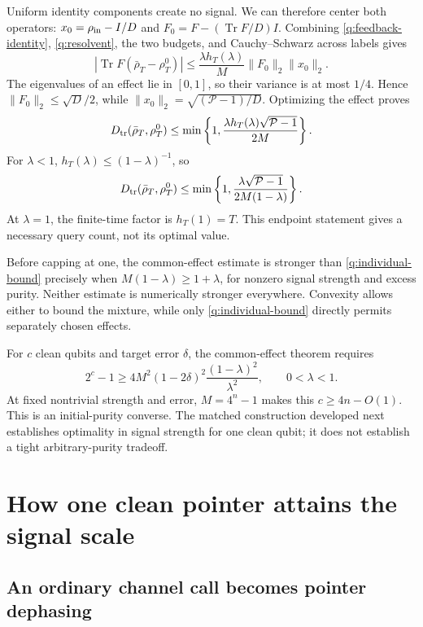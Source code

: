 \documentclass[11pt,a4paper]{article}
\numberwithin{equation}{section}
\theoremstyle{definition}
\theoremstyle{remark}
\DeclareMathOperator{\Tr}{Tr}
\begin{document}
Uniform identity components create no signal. We can therefore center both
operators:
$x_0=\rho_{\rm in}-I/D$ and
$F_0=F-(\Tr F/D)I$. Combining
\eqref{q:feedback-identity}, \eqref{q:resolvent}, the two budgets, and
Cauchy--Schwarz across labels gives
\[
 \left|\Tr F(\bar\rho_T-\rho_T^0)\right|
 \leq\frac{\lambda h_T(\lambda)}{M}\|F_0\|_2\|x_0\|_2 .
\]
The eigenvalues of an effect lie in $[0,1]$, so their variance is at most
$1/4$. Hence
$\|F_0\|_2\leq\sqrt{D}/2$, while
$\|x_0\|_2=\sqrt{(\mathcal P-1)/D}$. Optimizing the effect proves
\begin{equation}
 D_{\rm tr}(\bar\rho_T,\rho_T^0)
 \leq\min\left\{1,
       \frac{\lambda h_T(\lambda)\sqrt{\mathcal P-1}}{2M}\right\}.
 \label{q:common-finite}
\end{equation}
For $\lambda<1$, $h_T(\lambda)\leq(1-\lambda)^{-1}$, so
\begin{equation}
 D_{\rm tr}(\bar\rho_T,\rho_T^0)
 \leq\min\left\{1,
       \frac{\lambda\sqrt{\mathcal P-1}}{2M(1-\lambda)}\right\}.
 \label{q:common-infinite}
\end{equation}
At $\lambda=1$, the finite-time factor is $h_T(1)=T$.
This endpoint statement gives a necessary query count, not its optimal value.

Before capping at one, the common-effect estimate is stronger than
\eqref{q:individual-bound} precisely when
$M(1-\lambda)\geq1+\lambda$, for nonzero signal strength and excess purity.
Neither estimate is numerically stronger everywhere. Convexity allows either
to bound the mixture, while only \eqref{q:individual-bound} directly permits
separately chosen effects.

For $c$ clean qubits and target error $\delta$, the common-effect theorem
requires
\begin{equation}
 2^c-1\geq
 4M^2(1-2\delta)^2\frac{(1-\lambda)^2}{\lambda^2},
 \qquad 0<\lambda<1.
 \label{q:several-clean}
\end{equation}
At fixed nontrivial strength and error, $M=4^n-1$ makes this
$c\geq4n-O(1)$. This is an initial-purity converse. The matched construction
developed next establishes optimality in signal strength for one clean qubit;
it does not establish a tight arbitrary-purity tradeoff.

\section{How one clean pointer attains the signal scale}

\subsection{An ordinary channel call becomes pointer dephasing}
\end{document}
